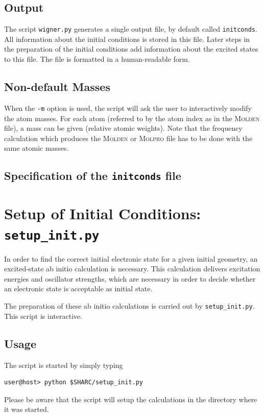\documentclass[a4paper,11pt,DIV=15,openany,twoside=false]{scrbook}
\newcommand{\todo}[1]{\textcolor{RL}{#1}}
\newcommand{\ttt}[1]{\texttt{#1}}
\begin{document}
\subsection{Output}

The script \ttt{wigner.py} generates a single output file, by default called \ttt{initconds}. All information about the initial conditions is stored in this file. Later steps in the preparation of the initial conditions add information about the excited states to this file. The file is formatted in a human-readable form.

\subsection{Non-default Masses}

When the \ttt{-m} option is used, the script will ask the user to interactively modify the atom masses. For each atom (referred to by the atom index as in the \textsc{Molden} file), a mass can be given (relative atomic weights). Note that the frequency calculation which produces the \textsc{Molden} or \textsc{Molpro} file has to be done with the same atomic masses.

\subsection{Specification of the \ttt{initconds} file}

\todo{}

\section{Setup of Initial Conditions: \ttt{setup\_init.py}}\label{sec:setup_init.py}

In order to find the correct initial electronic state for a given initial geometry, an excited-state ab initio calculation is necessary. This calculation delivers excitation energies and oscillator strengths, which are necessary in order to decide whether an electronic state is acceptable as initial state.

The preparation of these ab initio calculations is carried out by \ttt{setup\_init.py}. This script is interactive.

\subsection{Usage}

The script is started by simply typing 
\begin{verbatim}
user@host> python $SHARC/setup_init.py
\end{verbatim}
Please be aware that the script will setup the calculations in the directory where it was started.
\end{document}
